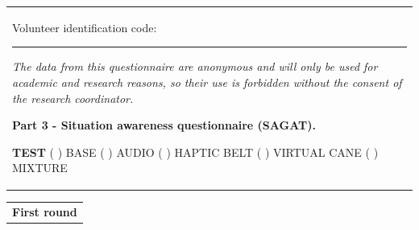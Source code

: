 %
%
%
%
%

\begin{table}[!htb]
    \centering
    \begin{tabular}{m{1\linewidth}}

        {\color{gray}

        Volunteer identification code: \rule{1in}{.2mm}
        
        \textit{The data from this questionnaire are anonymous and will only be used for academic and research reasons, so their use is forbidden without the consent of the research coordinator.}
        }
        
        \begin{center}
            \textbf{Part 3 - Situation awareness questionnaire (SAGAT).}
        \end{center}
        
        \noindent
        \textbf{TEST} ( ) BASE \hfill ( ) AUDIO \hfill ( ) HAPTIC BELT \hfill ( ) VIRTUAL CANE \hfill ( ) MIXTURE
        
    \end{tabular}

    \centering
    \begin{tabular}{m{1\linewidth}}
        \textbf{First round}
    \end{tabular}

\hspace{0.5cm}

%


\end{table}
